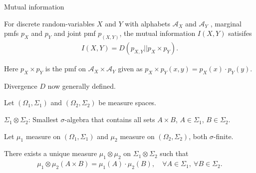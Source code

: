 \begin{frame}{Mutual information}
\bit 
\item For discrete random-variables $X$ and $Y$ with alphabets $\mathcal{A}_X$ and $\mathcal{A}_Y$ , marginal pmfs $p_X$ and $p_Y$ and joint 
pmf $p_{(X,Y)}$, the mutual information $I(X,Y)$ satisifes
\begin{align}\label{MutInfDisc}
I(X,Y)=D(p_{X,Y}||p_X\times p_Y). 
\end{align}
\item Here $p_X\times p_Y$ is the pmf on $\mathcal{A}_X\times\mathcal{A}_Y$ given as $p_X\times p_Y(x,y)=p_X(x)\cdot p_Y(y)$. 
\item Divergence $D$ now generally defined.  
\eit
{} 
\bit
\item Let $(\Omega_1,\Sigma_1)$ and $(\Omega_2,\Sigma_2)$ be measure spaces.
\item {} $\Sigma_1\otimes\Sigma_2$: Smallest $\sigma$-algebra that contains all sets $A\times B$, $A\in\Sigma_1$, $B\in\Sigma_2$. 
\item Let $\mu_1$ measure on $(\Omega_1,\Sigma_1)$ and $\mu_2$ 
measure on $(\Omega_2,\Sigma_2)$, both $\sigma$-finite.
\item {} There exists a unique measure $\mu_1\otimes \mu_2$ on $\Sigma_1\otimes\Sigma_2$ such that
\begin{align*}
\mu_1\otimes\mu_2(A\times B)=\mu_1(A)\cdot\mu_2(B),\quad \forall A\in \Sigma_1, \:\forall B\in\Sigma_2. 
\end{align*}
\eit
\end{frame}

